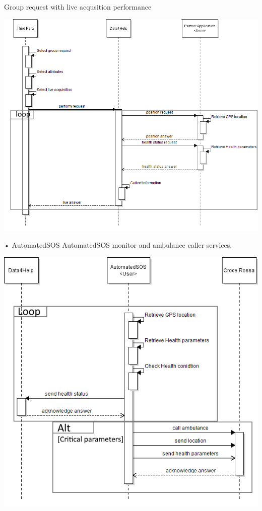 \begin{enumerate}
\begin{minipage}{\textwidth}
\end{minipage}

\begin{minipage}{\textwidth}
\FloatBarrier
Group request with live acqusition performance
\begin{center}
\includegraphics[scale=0.75]{Images/Seq_Data4Help_live.png}
\end{center}
\FloatBarrier
\end{minipage}


\begin{minipage}{\textwidth}
\item[•]{\Large AutomatedSOS}
\FloatBarrier
AutomatedSOS monitor and ambulance caller services.
\begin{center}
\includegraphics[scale=0.8]{Images/Seq_AutoSOS_monitor.png}
\end{center}
\FloatBarrier
\end{minipage}



\end{enumerate}
